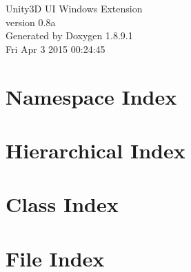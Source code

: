 \documentclass[twoside]{book}
\newcommand{\+}{\discretionary{\mbox{\scriptsize$\hookleftarrow$}}{}{}}
\newcommand{\clearemptydoublepage}{%
  \newpage{\pagestyle{empty}\cleardoublepage}%
}
\begin{document}
\hypersetup{pageanchor=false,
             bookmarks=true,
             bookmarksnumbered=true,
             pdfencoding=unicode
            }
\begin{titlepage}
\vspace*{7cm}
\begin{center}%
{\Large Unity3\+D U\+I Windows Extension \\[1ex]\large version 0.\+8a }\\
\vspace*{1cm}
{\large Generated by Doxygen 1.8.9.1}\\
\vspace*{0.5cm}
{\small Fri Apr 3 2015 00:24:45}\\
\end{center}
\end{titlepage}
\clearemptydoublepage
\tableofcontents
\clearemptydoublepage
{}
\hypersetup{pageanchor=true}

\chapter{Namespace Index}

\chapter{Hierarchical Index}

\chapter{Class Index}

\chapter{File Index}

\end{document}
